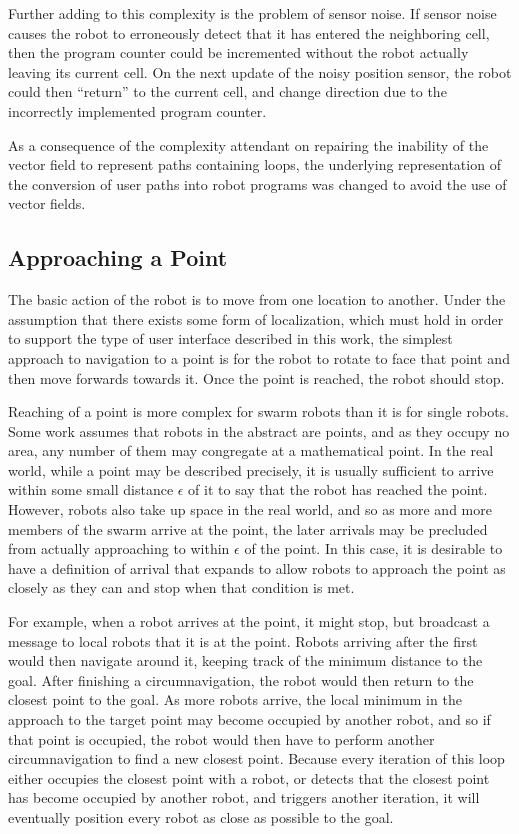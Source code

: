 Further adding to this complexity is the problem of sensor noise. 
If sensor noise causes the robot to erroneously detect that it has entered the neighboring cell, then the program counter could be incremented without the robot actually leaving its current cell. 
On the next update of the noisy position sensor, the robot could then ``return'' to the current cell, and change direction due to the incorrectly implemented program counter. 

As a consequence of the complexity attendant on repairing the inability of the vector field to represent paths containing loops, the underlying representation of the conversion of user paths into robot programs was changed to avoid the use of vector fields. 

\subsection{Approaching a Point}

The basic action of the robot is to move from one location to another. 
Under the assumption that there exists some form of localization, which must hold in order to support the type of user interface described in this work, the simplest approach to navigation to a point is for the robot to rotate to face that point and then move forwards towards it. Once the point is reached, the robot should stop. 

Reaching of a point is more complex for swarm robots than it is for single robots. 
Some work assumes that robots in the abstract are points, and as they occupy no area, any number of them may congregate at a mathematical point. 
In the real world, while a point may be described precisely, it is usually sufficient to arrive within some small distance $\epsilon$ of it to say that the robot has reached the point. 
However, robots also take up space in the real world, and so as more and more members of the swarm arrive at the point, the later arrivals may be precluded from actually approaching to within $\epsilon$ of the point.
In this case, it is desirable to have a definition of arrival that expands to allow robots to approach the point as closely as they can and stop when that condition is met. 

For example, when a robot arrives at the point, it might stop, but broadcast a message to local robots that it is at the point. 
Robots arriving after the first would then navigate around it, keeping track of the minimum distance to the goal. 
After finishing a circumnavigation, the robot would then return to the closest point to the goal. 
As more robots arrive, the local minimum in the approach to the target point may become occupied by another robot, and so if that point is occupied, the robot would then have to perform another circumnavigation to find a new closest point. 
Because every iteration of this loop either occupies the closest point with a robot, or detects that the closest point has become occupied by another robot, and triggers another iteration, it will eventually position every robot as close as possible to the goal. 

